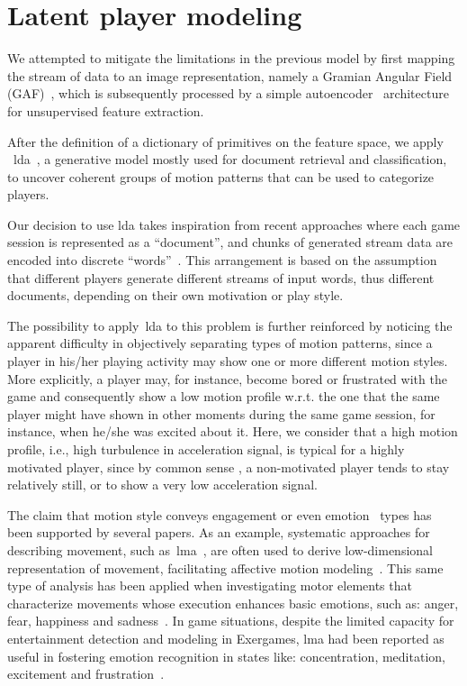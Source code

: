 \section{Latent player modeling}

We attempted to mitigate the limitations in the previous model by first mapping the stream of data to an image representation, namely a Gramian Angular Field (GAF)~\citep{wang_imaging_2015}, which is subsequently processed by a simple autoencoder~\citep{goodfellow_deep_2016} architecture for unsupervised feature extraction. %

After the definition of a dictionary of primitives on the feature space, we apply ~\gls{lda}~\citep{blei_latent_2003}, a generative model mostly used for document retrieval and classification, to uncover coherent groups of motion patterns that can be used to categorize players.

Our decision to use \gls{lda} takes inspiration from recent approaches where each game session is represented as a ``document'', and chunks of generated stream data are encoded into discrete ``words''~\citep{smith_mining_2016}. This arrangement is based on the assumption that different players generate different streams of input words, thus different documents, depending on their own motivation or play style. 

The possibility to apply~\gls{lda} to this problem is further reinforced by noticing the apparent difficulty in objectively separating types of motion patterns, since a player in his/her playing activity may show one or more different motion styles. More explicitly, a player may, for instance, become bored or frustrated with the game and consequently show a low motion profile w.r.t. the one that the same player might have shown in other moments during the same game session, for instance, when he/she was excited about it. Here, we consider that a high motion profile, i.e., high turbulence in acceleration signal, is typical for a highly motivated player, since by common sense %
, a non-motivated player {tends} to stay relatively still, or to show a very low acceleration signal.

The claim that motion style conveys engagement or even emotion~\cite{aristidou_emotion_2015,shafir_emotion_2016,tsachor_somatic_2017} types has been supported by several papers. As an example, systematic approaches for describing movement, such as~\gls{lma}~\cite{laban_language_1974}, are often used to derive low-dimensional representation of movement, facilitating affective motion modeling~\cite{burton_laban_2016}. This same type of analysis has been applied when investigating motor elements that characterize movements whose execution enhances basic emotions, such as: anger, fear, happiness and sadness~\cite{shafir_emotion_2016}. In game situations, despite the limited capacity for entertainment detection and modeling in Exergames, \gls{lma} had been reported as useful in fostering emotion recognition in states like: concentration, meditation, excitement and frustration~\cite{zacharatos_emotion_2013}.


